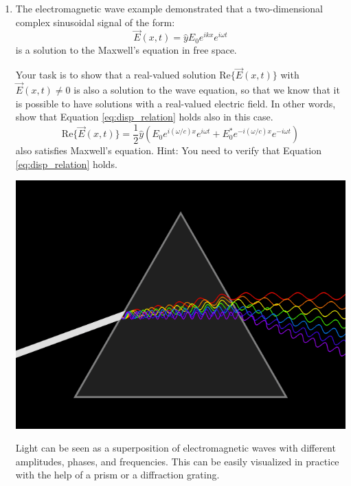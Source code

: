 \begin{enumerate}
\item The electromagnetic wave example demonstrated that a two-dimensional complex sinusoidal signal of the form:
\begin{equation}
    \vec{E}(x,t) = \hat{y}E_0 e^{i k x} e^{i \omega t}
\end{equation}
is a solution to the Maxwell's equation in free space.

Your task is to show that a real-valued solution $\mathrm{Re}\{\vec{E}(x,t)\}$ with $\vec{E}(x,t)\ne 0$ is also a solution to the wave equation, 
so that we know that it is possible to have solutions with a real-valued electric field. In other words, show that Equation \ref{eq:disp_relation} holds also in this case.
  \begin{equation}
    \mathrm{Re}\{\vec{E}(x,t)\} = \frac{1}{2}\hat{y}\left(E_0 e^{i (\omega/c) x} e^{i \omega t} + E_0^* e^{-i (\omega/c) x} e^{-i \omega t}\right)
  \end{equation}
  also satisfies Maxwell's equation. Hint: You need to verify that
  Equation \ref{eq:disp_relation} holds.
\fi
  \begin{marginfigure}[0cm]
\begin{center}
  \includegraphics[width=\textwidth]{ch06/figures/prism.png}
\end{center}
\caption{Light can be seen as a superposition of electromagnetic waves with different amplitudes, phases, and frequencies. This can be easily visualized in practice with the help of a prism or a diffraction grating.}
\label{fig:prism_ex}
\end{marginfigure}


\end{enumerate}
